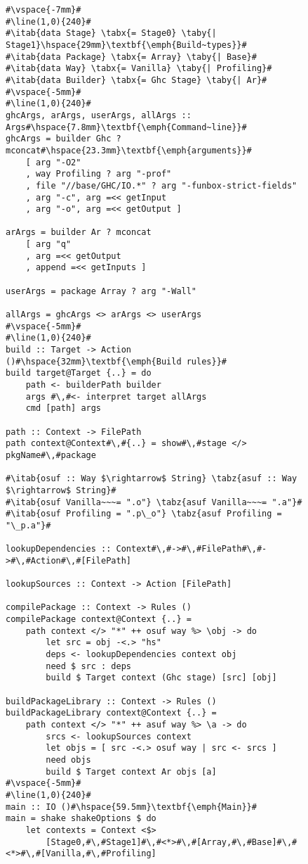 \begin{figure}
\begin{lstlisting}
#\vspace{-7mm}#
#\line(1,0){240}#
#\itab{data Stage} \tabx{= Stage0} \taby{| Stage1}\hspace{29mm}\textbf{\emph{Build~types}}#
#\itab{data Package} \tabx{= Array} \taby{| Base}#
#\itab{data Way} \tabx{= Vanilla} \taby{| Profiling}#
#\itab{data Builder} \tabx{= Ghc Stage} \taby{| Ar}#
#\vspace{-5mm}#
#\line(1,0){240}#
ghcArgs, arArgs, userArgs, allArgs :: Args#\hspace{7.8mm}\textbf{\emph{Command~line}}#
ghcArgs = builder Ghc ? mconcat#\hspace{23.3mm}\textbf{\emph{arguments}}#
    [ arg "-O2"
    , way Profiling ? arg "-prof"
    , file "//base/GHC/IO.*" ? arg "-funbox-strict-fields" 
    , arg "-c", arg =<< getInput 
    , arg "-o", arg =<< getOutput ]

arArgs = builder Ar ? mconcat
    [ arg "q"
    , arg =<< getOutput
    , append =<< getInputs ]

userArgs = package Array ? arg "-Wall"

allArgs = ghcArgs <> arArgs <> userArgs
#\vspace{-5mm}#
#\line(1,0){240}#
build :: Target -> Action ()#\hspace{32mm}\textbf{\emph{Build rules}}#
build target@Target {..} = do
    path <- builderPath builder
    args #\,#<- interpret target allArgs
    cmd [path] args

path :: Context -> FilePath
path context@Context#\,#{..} = show#\,#stage </> pkgName#\,#package

#\itab{osuf :: Way $\rightarrow$ String} \tabz{asuf :: Way $\rightarrow$ String}#
#\itab{osuf Vanilla~~~= ".o"} \tabz{asuf Vanilla~~~= ".a"}#
#\itab{osuf Profiling = ".p\_o"} \tabz{asuf Profiling = "\_p.a"}#

lookupDependencies :: Context#\,#->#\,#FilePath#\,#->#\,#Action#\,#[FilePath]

lookupSources :: Context -> Action [FilePath]

compilePackage :: Context -> Rules ()
compilePackage context@Context {..} = 
    path context </> "*" ++ osuf way %> \obj -> do
        let src = obj -<.> "hs"
        deps <- lookupDependencies context obj
        need $ src : deps
        build $ Target context (Ghc stage) [src] [obj]

buildPackageLibrary :: Context -> Rules ()
buildPackageLibrary context@Context {..} = 
    path context </> "*" ++ asuf way %> \a -> do
        srcs <- lookupSources context
        let objs = [ src -<.> osuf way | src <- srcs ]
        need objs
        build $ Target context Ar objs [a]
#\vspace{-5mm}#
#\line(1,0){240}#
main :: IO ()#\hspace{59.5mm}\textbf{\emph{Main}}#
main = shake shakeOptions $ do
    let contexts = Context <$> 
        [Stage0,#\,#Stage1]#\,#<*>#\,#[Array,#\,#Base]#\,#<*>#\,#[Vanilla,#\,#Profiling]
  

\end{lstlisting}
\end{figure}
